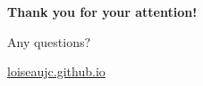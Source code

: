 \documentclass[aspectratio=169,compress,12pt,dvipsnames]{beamer}
\begin{document}
\End

\begin{frame}
    \vfill
    \begin{minipage}{.68\textwidth}
        {
            \Large
            \textbf{Thank you for your attention!}
        }
        \par\bigskip
        {
            Any questions?
        }
    \end{minipage}%
    \hfill
    \begin{minipage}{.28\textwidth}
        \centering
        \scalebox{4}{\faGithub} \par\bigskip
        \tiny
        \url{loiseaujc.github.io}
    \end{minipage}
    \vfill
\end{frame}
\end{document}
